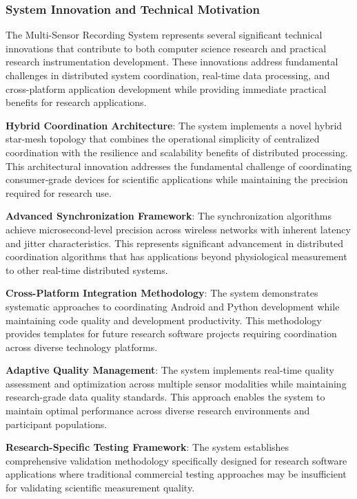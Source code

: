 \documentclass[12pt,a4paper]{article}
\begin{document}
\subsubsection{System Innovation and Technical Motivation}

The Multi-Sensor Recording System represents several significant technical innovations that contribute to both computer
science research and practical research instrumentation development. These innovations address fundamental challenges in
distributed system coordination, real-time data processing, and cross-platform application development while providing
immediate practical benefits for research applications.

\textbf{Hybrid Coordination Architecture}: The system implements a novel hybrid star-mesh topology that combines the
operational simplicity of centralized coordination with the resilience and scalability benefits of distributed
processing. This architectural innovation addresses the fundamental challenge of coordinating consumer-grade devices for
scientific applications while maintaining the precision required for research use.

\textbf{Advanced Synchronization Framework}: The synchronization algorithms achieve microsecond-level precision across
wireless networks with inherent latency and jitter characteristics. This represents significant advancement in
distributed coordination algorithms that has applications beyond physiological measurement to other real-time
distributed systems.

\textbf{Cross-Platform Integration Methodology}: The system demonstrates systematic approaches to coordinating Android and
Python development while maintaining code quality and development productivity. This methodology provides templates for
future research software projects requiring coordination across diverse technology platforms.

\textbf{Adaptive Quality Management}: The system implements real-time quality assessment and optimization across multiple
sensor modalities while maintaining research-grade data quality standards. This approach enables the system to maintain
optimal performance across diverse research environments and participant populations.

\textbf{Research-Specific Testing Framework}: The system establishes comprehensive validation methodology specifically
designed for research software applications where traditional commercial testing approaches may be insufficient for
validating scientific measurement quality.
\end{document}
